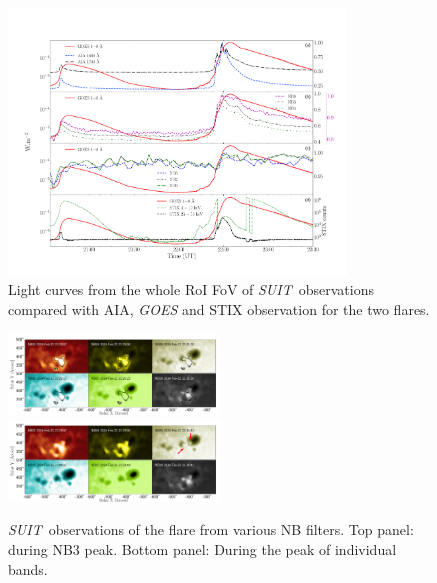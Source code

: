 \documentclass[12pt]{article}
\newcommand{\suit}{{\it{SUIT}}}
\begin{document}
\begin{figure}
    \centering
    \includegraphics[width=0.8\textwidth,trim={2.3cm 2.5cm 1cm 4.5cm},clip]{lc_full_suit_contour.pdf}
    \caption{Light curves from the whole RoI FoV of \suit~observations compared with AIA, {\it GOES} and STIX observation for the two flares.}
    \label{fig:flare_full}
\end{figure}

\begin{figure}
    \centering
    \includegraphics[trim={0cm 0.65cm 0cm 0cm},clip,width=0.5\textwidth]{suit_roi_nb3_peak.pdf} \\
    \includegraphics[width=0.5\textwidth]{suit_roi_all_peak.pdf}
    \caption{\suit~observations of the flare from various NB filters. Top panel: during NB3 peak. Bottom panel: During the peak of individual bands.}
    \label{fig:flare_nb3_peak}
\end{figure}
\end{document}
